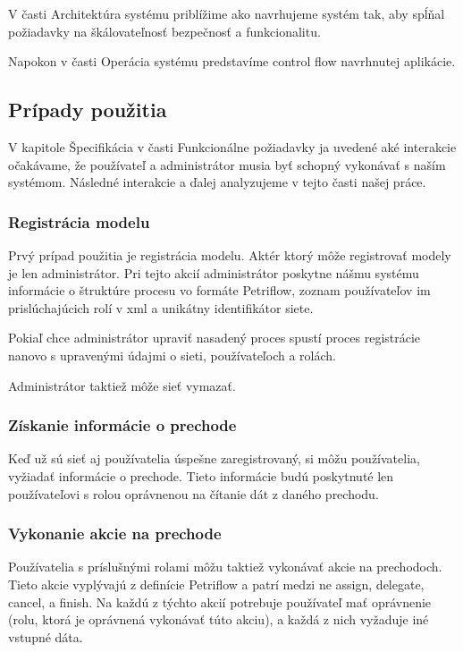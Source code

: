 V časti Architektúra systému priblížime ako navrhujeme systém tak, aby spĺňal požiadavky na škálovateľnosť bezpečnosť a funkcionalitu.

Napokon v časti Operácia systému predstavíme control flow navrhnutej aplikácie.


\subsection{Prípady použitia} \label{usecases}
V kapitole Špecifikácia v časti Funkcionálne požiadavky ja uvedené aké interakcie očakávame, že používateľ a administrátor musia byť schopný vykonávať s naším systémom. Následné interakcie a ďalej analyzujeme v tejto časti našej práce. 

\subsubsection{Registrácia modelu}
Prvý prípad použitia je registrácia modelu. Aktér ktorý môže registrovať modely je len administrátor. Pri tejto akcií administrátor poskytne nášmu systému informácie o štruktúre procesu vo formáte Petriflow, zoznam používateľov im prislúchajúcich rolí v \acrshort{xml} a unikátny identifikátor siete.

Pokiaľ chce administrátor upraviť nasadený proces spustí proces registrácie nanovo s upravenými údajmi o sieti, používateľoch a rolách.

Administrátor taktiež môže sieť vymazať.

\subsubsection{Získanie informácie o prechode}
Keď už sú sieť aj používatelia úspešne zaregistrovaný, si môžu používatelia, vyžiadať informácie o prechode. Tieto informácie budú poskytnuté len používateľovi s rolou oprávnenou na čítanie dát z daného prechodu.

\subsubsection{Vykonanie akcie na prechode}
Používatelia s príslušnými rolami môžu taktiež vykonávať akcie na prechodoch. Tieto akcie vyplývajú z definície Petriflow a patrí medzi ne assign, delegate, cancel, a finish. Na každú z týchto akcií potrebuje používateľ mať oprávnenie (rolu, ktorá je oprávnená vykonávať túto akciu), a každá z nich vyžaduje iné vstupné dáta.

